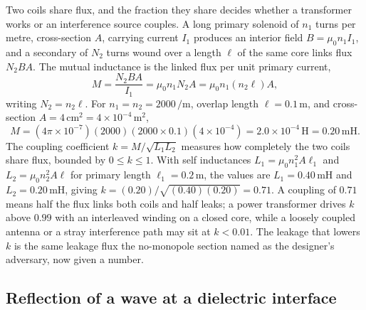 Two coils share flux, and the fraction they share decides whether a
transformer works or an interference source couples. A long primary
solenoid of $n_1$ turns per metre, cross-section $A$, carrying current
$I_1$ produces an interior field $B = \mu_0 n_1 I_1$, and a secondary of
$N_2$ turns wound over a length $\ell$ of the same core links flux
$N_2 B A$. The mutual inductance is the linked flux per unit primary
current,
\[
M = \frac{N_2 B A}{I_1} = \mu_0 n_1 N_2 A = \mu_0 n_1 (n_2\ell) A,
\]
writing $N_2 = n_2\ell$. For $n_1 = n_2 = 2000\,\si{\per\meter}$, overlap
length $\ell = 0.1\,\si{\meter}$, and cross-section $A = 4\,\si{\centi
\meter\squared} = 4\times 10^{-4}\,\si{\meter\squared}$,
\[
M = (4\pi\times 10^{-7})(2000)(2000\times 0.1)(4\times 10^{-4}) = 2.0
\times 10^{-4}\,\si{\henry} = 0.20\,\si{\milli\henry}.
\]
The coupling coefficient $k = M/\sqrt{L_1 L_2}$ measures how completely
the two coils share flux, bounded by $0 \le k \le 1$. With self
inductances $L_1 = \mu_0 n_1^{2} A \ell_1$ and $L_2 = \mu_0 n_2^{2} A
\ell$ for primary length $\ell_1 = 0.2\,\si{\meter}$, the values are
$L_1 = 0.40\,\si{\milli\henry}$ and $L_2 = 0.20\,\si{\milli\henry}$,
giving $k = (0.20)/\sqrt{(0.40)(0.20)} = 0.71$. A coupling of $0.71$ means
half the flux links both coils and half leaks; a power transformer drives
$k$ above $0.99$ with an interleaved winding on a closed core, while a
loosely coupled antenna or a stray interference path may sit at $k <
0.01$. The leakage that lowers $k$ is the same leakage flux the no-monopole
section named as the designer's adversary, now given a number.

\subsection{Reflection of a wave at a dielectric interface}

